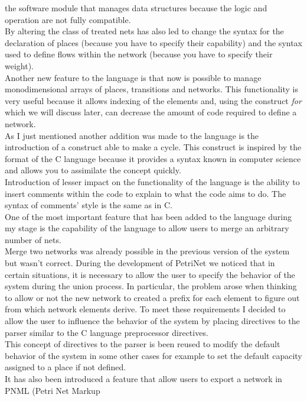 \documentclass[english,12pt]{report}
\begin{document}
the software module that manages data structures because the logic and operation are not fully 
compatible. \\
By altering the class of treated nets has also led to change the syntax for the declaration of places 
(because you have to specify their capability) and the syntax used to define flows within the network
(because you have to specify their weight).\\
Another new feature to the language is that now is possible to manage monodimensional arrays of
places, transitions and networks. This functionality is very useful because it allows indexing of the 
elements and, using the construct \emph{for} which we will discuss later, can decrease the amount 
of code required to define a network. \\
As I just mentioned another addition was made to the language is the introduction of a construct 
able to make a cycle. This construct is inspired by the format of the C language because it provides
a syntax known in computer science and allows you to assimilate the concept quickly. \\
Introduction of lesser impact on the functionality of the language is the ability to insert comments 
within the code to explain to what the code aims to do. The syntax of comments' style is the same 
as in C. \\
One of the most important feature that has been added to the language during my stage is the 
capability of the language to allow users to merge an arbitrary number of nets.\\
Merge two networks was already possible in the previous version of the system but wasn't correct.
During the development of PetriNet we noticed that in certain situations, it is necessary to allow the 
user to specify the behavior of the system during the union process. In particular, the problem arose 
when thinking to allow or not the new network to created a prefix for each element to figure out 
from which network elements derive. To meet these requirements I decided to allow the user to 
influence the behavior of the system by placing directives to the parser similar to the C language 
preprocessor directives. \\
This concept of directives to the parser is been reused to modify the default behavior of the system in 
some other cases for example to set the default capacity assigned to a place if not defined. \\
It has also been introduced a feature that allow users to export a network in PNML (Petri Net Markup
\end{document}
